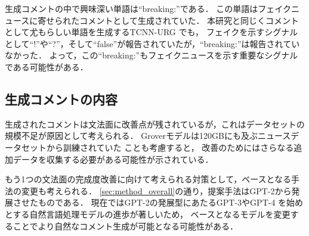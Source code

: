生成コメントの中で興味深い単語は``breaking:''である．
この単語はフェイクニュースに寄せられたコメントとして生成されていた．
本研究と同じくコメントとして尤もらしい単語を生成するTCNN-URG \cite{ijcai2018-533}でも，
フェイクを示すシグナルとして``!''や``?''，そして``false''が報告されていたが，``breaking:''は報告されていなかった．
よって，この``breaking:''もフェイクニュースを示す重要なシグナルである可能性がある．

\subsection{生成コメントの内容}
生成されたコメントは文法面に改善点が残されているが，これはデータセットの規模不足が原因として考えられる．
Groverモデルは120GBにも及ぶニュースデータセットから訓練されていた \cite{DBLP:journals/corr/abs-1905-12616}ことも考慮すると，
改善のためにはさらなる追加データを収集する必要がある可能性が示されている．

もう1つの文法面の完成度改善に向けて考えられる対策として，ベースとなる手法の変更も考えられる．
\cref{sec:method_overall}の通り，提案手法はGPT-2から発展させたものである．
現在ではGPT-2の発展型にあたるGPT-3\cite{brown2020language}やGPT-4 \cite{openai2023gpt4}を始めとする自然言語処理モデルの進歩が著しいため，
ベースとなるモデルを変更することでより自然なコメント生成が可能となる可能性がある．
